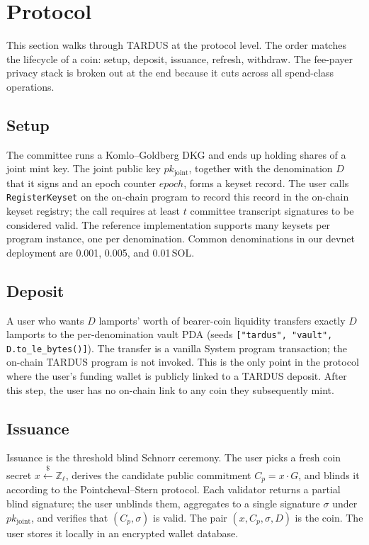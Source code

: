 \section{Protocol}
\label{sec:protocol}

This section walks through TARDUS at the protocol level. The order matches the lifecycle of a coin: setup, deposit, issuance, refresh, withdraw. The fee-payer privacy stack is broken out at the end because it cuts across all spend-class operations.

\subsection{Setup}
\label{sec:proto-setup}

The committee runs a Komlo--Goldberg DKG and ends up holding shares of a joint mint key. The joint public key $pk_{\mathrm{joint}}$, together with the denomination $D$ that it signs and an epoch counter $\mathit{epoch}$, forms a keyset record. The user calls \texttt{RegisterKeyset} on the on-chain program to record this record in the on-chain keyset registry; the call requires at least $t$ committee transcript signatures to be considered valid. The reference implementation supports many keysets per program instance, one per denomination. Common denominations in our devnet deployment are 0.001, 0.005, and 0.01\,SOL.

\subsection{Deposit}
\label{sec:proto-deposit}

A user who wants $D$ lamports' worth of bearer-coin liquidity transfers exactly $D$ lamports to the per-denomination vault PDA (seeds \texttt{["tardus", "vault", D.to\_le\_bytes()]}). The transfer is a vanilla System program transaction; the on-chain TARDUS program is not invoked. This is the only point in the protocol where the user's funding wallet is publicly linked to a TARDUS deposit. After this step, the user has no on-chain link to any coin they subsequently mint.

\subsection{Issuance}
\label{sec:proto-issue}

Issuance is the threshold blind Schnorr ceremony. The user picks a fresh coin secret $x \xleftarrow{\$} \mathbb{Z}_\ell$, derives the candidate public commitment $C_p = x \cdot G$, and blinds it according to the Pointcheval--Stern protocol. Each validator returns a partial blind signature; the user unblinds them, aggregates to a single signature $\sigma$ under $pk_{\mathrm{joint}}$, and verifies that $(C_p, \sigma)$ is valid. The pair $(x, C_p, \sigma, D)$ is the coin. The user stores it locally in an encrypted wallet database.

